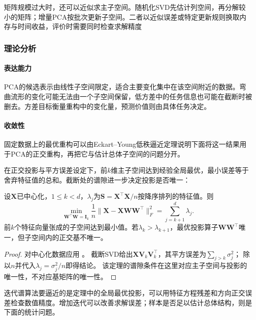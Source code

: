 矩阵规模过大时，还可以近似求主子空间。随机化SVD先估计列空间，再分解较小的矩阵；增量PCA按批次更新子空间。二者以近似误差或特定更新规则换取内存与时间收益，评价时需要同时检查求解精度

\subsubsection{理论分析}
\label{sec:dim-pca-theory}

\paragraph{表达能力}
PCA的候选表示由线性子空间限定，适合主要变化集中在该空间附近的数据。弯曲流形的变化可能无法由一个子空间保留，低方差中的任务信息也可能在截断时被删去。方差目标衡量重构中的变化量，预测价值则由具体任务决定。

\paragraph{收敛性}

固定数据上的最优重构可以由Eckart--Young低秩逼近定理说明下面将这一结果用于PCA的正交重构，再把它与估计总体子空间的问题分开。

在正交投影与平方误差设定下，前$k$维主子空间达到经验全局最优，最小误差等于舍弃特征值的总和。截断处的谱隙进一步决定投影是否唯一：

\begin{theorem}[PCA的最优线性重构性质]
  \label{thm:dim-pca-optimal}
  设$\bm{X}$已中心化，$1\leq k<d$，$\lambda_j$为$\bm{S}=\bm{X}^{\top}\bm{X}/n$按降序排列的特征值。则
  \[
    \min_{\bm{W}^{\top}\bm{W}=\bm{I}_k}
       \frac1n\lVert\bm{X}-\bm{X}\bm{W}\bm{W}^{\top}\rVert_F^2
       =\sum_{j=k+1}^{d}\lambda_j.
  \]
  前$k$个特征向量张成的子空间达到最小值。若$\lambda_k>\lambda_{k+1}$，最优投影算子$\bm{W}\bm{W}^{\top}$唯一，但子空间内的正交基不唯一。
\end{theorem}

\begin{proof}
对中心化数据应用
。
截断SVD给出$\bm X\bm V_k\bm V_k^\top$，其平方误差为$\sum_{j>k}\sigma_j^2$；
除以$n$并代入$\lambda_j=\sigma_j^2/n$即得结论。
该定理的谱隙条件在这里对应主子空间与投影的唯一性，不对应基矩阵的唯一性。
\end{proof}

迭代谱算法要逼近的是定理中的全局最优投影，可以用特征方程残差和方向正交误差检查数值精度。增加迭代可以改善求解误差；样本是否足以估计总体结构，则是下面的统计问题。

